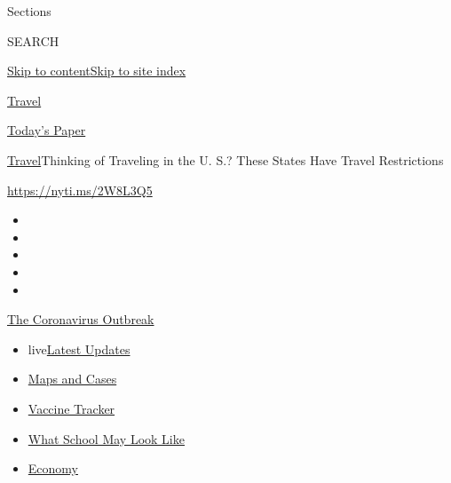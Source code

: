 Sections

SEARCH

\protect\hyperlink{site-content}{Skip to
content}\protect\hyperlink{site-index}{Skip to site index}

\href{https://www.nytimes.com/section/travel}{Travel}

\href{https://myaccount.nytimes.com/auth/login?response_type=cookie\&client_id=vi}{}

\href{https://www.nytimes.com/section/todayspaper}{Today's Paper}

\href{/section/travel}{Travel}\textbar{}Thinking of Traveling in the U.
S.? These States Have Travel Restrictions

\url{https://nyti.ms/2W8L3Q5}

\begin{itemize}
\item
\item
\item
\item
\item
\end{itemize}

\href{https://www.nytimes.com/news-event/coronavirus?action=click\&pgtype=Article\&state=default\&region=TOP_BANNER\&context=storylines_menu}{The
Coronavirus Outbreak}

\begin{itemize}
\tightlist
\item
  live\href{https://www.nytimes.com/2020/08/01/world/coronavirus-covid-19.html?action=click\&pgtype=Article\&state=default\&region=TOP_BANNER\&context=storylines_menu}{Latest
  Updates}
\item
  \href{https://www.nytimes.com/interactive/2020/us/coronavirus-us-cases.html?action=click\&pgtype=Article\&state=default\&region=TOP_BANNER\&context=storylines_menu}{Maps
  and Cases}
\item
  \href{https://www.nytimes.com/interactive/2020/science/coronavirus-vaccine-tracker.html?action=click\&pgtype=Article\&state=default\&region=TOP_BANNER\&context=storylines_menu}{Vaccine
  Tracker}
\item
  \href{https://www.nytimes.com/interactive/2020/07/29/us/schools-reopening-coronavirus.html?action=click\&pgtype=Article\&state=default\&region=TOP_BANNER\&context=storylines_menu}{What
  School May Look Like}
\item
  \href{https://www.nytimes.com/live/2020/07/31/business/stock-market-today-coronavirus?action=click\&pgtype=Article\&state=default\&region=TOP_BANNER\&context=storylines_menu}{Economy}
\end{itemize}

